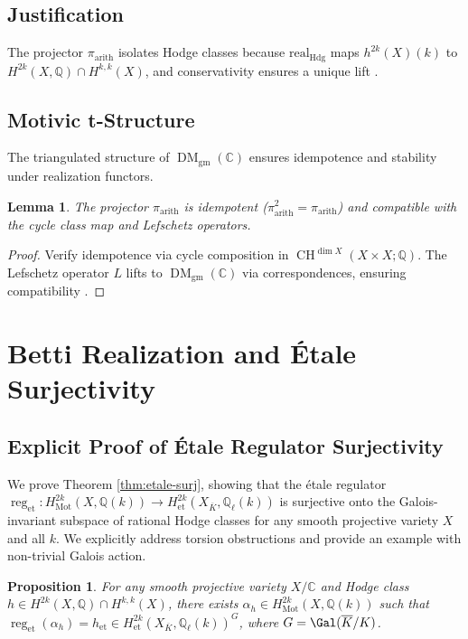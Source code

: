 \documentclass[11pt]{article}
\newtheorem{lemma}[theorem]{Lemma}
\newtheorem{proposition}[theorem]{Proposition}
\DeclareMathOperator{\CH}{CH}
\DeclareMathOperator{\Mot}{Mot}
\DeclareMathOperator{\reg}{reg}
\DeclareMathOperator{\DM}{DM}
\begin{document}
\subsection{Justification}
The projector \(\pi_{\mathrm{arith}}\) isolates Hodge classes because \(\mathrm{real}_{\mathrm{Hdg}}\) maps \(h^{2k}(X)(k)\) to \(H^{2k}(X, \mathbb{Q}) \cap H^{k,k}(X)\), and conservativity ensures a unique lift \cite{cisinski2019triangulated}.

\subsection{Motivic t-Structure}
The triangulated structure of \(\DM_{\mathrm{gm}}(\mathbb{C})\) \cite{voevodsky2000} ensures idempotence and stability under realization functors.

\begin{lemma}\label{lem:equivariant}
The projector \(\pi_{\mathrm{arith}}\) is idempotent (\(\pi_{\mathrm{arith}}^2 = \pi_{\mathrm{arith}}\)) and compatible with the cycle class map and Lefschetz operators.
\end{lemma}

\begin{proof}
Verify idempotence via cycle composition in \(\CH^{\dim X}(X \times X; \mathbb{Q})\). The Lefschetz operator \(L\) lifts to \(\DM_{\mathrm{gm}}(\mathbb{C})\) via correspondences, ensuring compatibility \cite{voevodsky2000}.
\end{proof}

\section{Betti Realization and Étale Surjectivity}
\subsection{Explicit Proof of Étale Regulator Surjectivity}\label{subsec:etale-surj-proof}
We prove Theorem \ref{thm:etale-surj}, showing that the étale regulator \(\reg_{\mathrm{et}}: H^{2k}_{\Mot}(X, \mathbb{Q}(k)) \to H^{2k}_{\mathrm{et}}(X_{\overline{K}}, \mathbb{Q}_\ell(k))\) is surjective onto the Galois-invariant subspace of rational Hodge classes for any smooth projective variety \(X\) and all \(k\). We explicitly address torsion obstructions and provide an example with non-trivial Galois action.

\begin{proposition}\label{prop:etale-lift}
For any smooth projective variety \(X/\mathbb{C}\) and Hodge class \(h \in H^{2k}(X, \mathbb{Q}) \cap H^{k,k}(X)\), there exists \(\alpha_h \in H^{2k}_{\Mot}(X, \mathbb{Q}(k))\) such that \(\reg_{\mathrm{et}}(\alpha_h) = h_{\mathrm{et}} \in H^{2k}_{\mathrm{et}}(X_{\overline{K}}, \mathbb{Q}_\ell(k))^G\), where \(G = \Gal(\overline{K}/K)\).
\end{proposition}
\end{document}
